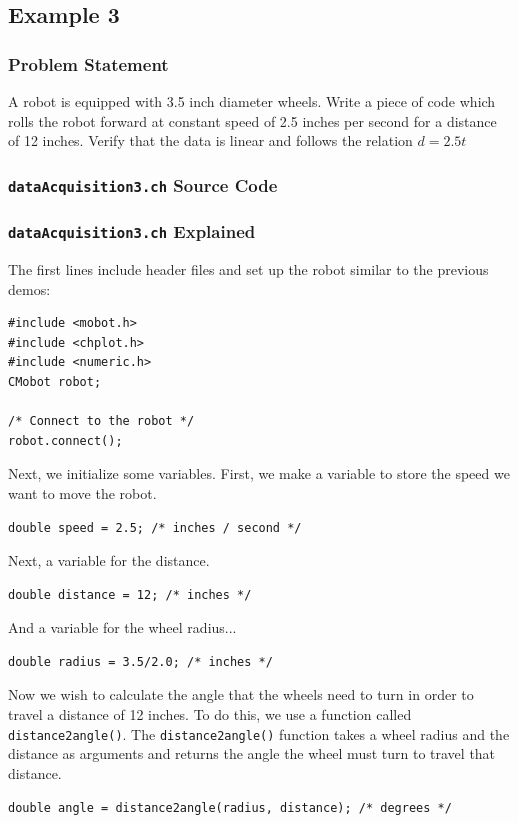 \documentclass{article}
\begin{document}
\subsection{Example 3}
\subsubsection{Problem Statement}
A robot is equipped with 3.5 inch diameter wheels. Write a piece of code which rolls the
robot forward at constant speed of 2.5 inches per second for a distance of 12 inches. 
Verify that the data is linear and follows the relation $d = 2.5t$

\subsubsection{\texttt{dataAcquisition3.ch} Source Code}


\subsubsection{\texttt{dataAcquisition3.ch} Explained}
The first lines include header files and set up the robot similar to the previous
demos:
\begin{verbatim}
#include <mobot.h>
#include <chplot.h>
#include <numeric.h>
CMobot robot;

/* Connect to the robot */
robot.connect();
\end{verbatim}

Next, we initialize some variables. First, we make a variable to store the speed
we want to move the robot.
\begin{verbatim}
double speed = 2.5; /* inches / second */
\end{verbatim}

Next, a variable for the distance.
\begin{verbatim}
double distance = 12; /* inches */
\end{verbatim}

And a variable for the wheel radius...
\begin{verbatim}
double radius = 3.5/2.0; /* inches */
\end{verbatim}

Now we wish to calculate the angle that the wheels need to turn in order to
travel a distance of 12 inches. To do this, we use a function called
\texttt{distance2angle()}. The \texttt{distance2angle()} function 
takes a wheel radius and the distance as arguments and returns the angle
the wheel must turn to travel that distance. 
\begin{verbatim}
double angle = distance2angle(radius, distance); /* degrees */
\end{verbatim}
\end{document}
